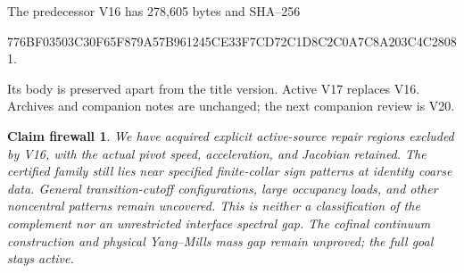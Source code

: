 \documentclass[11pt,oneside]{article}
\newtheorem{firewall}[theorem]{Claim firewall}
\begin{document}
The predecessor V16 has 278,605 bytes and SHA--256
\begin{center}\scriptsize\ttfamily
776BF03503C30F65F879A57B961245CE33F7CD72C1D8C2C0A7C8A203C4C28081.
\end{center}
Its body is preserved apart from the title version.
Active V17 replaces V16. Archives and companion
notes are unchanged; the next companion review is V20.

\begin{firewall}
We have acquired explicit active-source repair
regions excluded by V16, with the actual pivot
speed, acceleration, and Jacobian retained.
The certified family still lies near specified
finite-collar sign patterns at identity coarse
data. General transition-cutoff configurations,
large occupancy loads, and other noncentral
patterns remain uncovered. This is neither a
classification of the complement nor an unrestricted
interface spectral gap. The cofinal continuum
construction and physical Yang--Mills mass gap
remain unproved; the full goal stays active.
\end{firewall}
\end{document}
